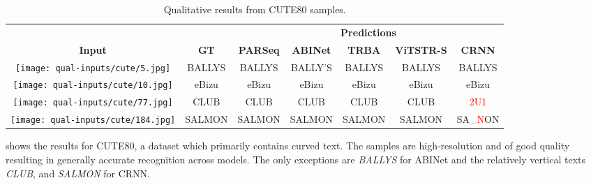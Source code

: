 \begin{table*}[htbp]
\newcommand{\customsize}{\scriptsize}
  \footnotesize
  \centering
  \setlength\tabcolsep{2pt}
  \caption{Qualitative results from CUTE80 samples.}
  \begin{tabular}{ c c c c c c c }
    \toprule
    & & \multicolumn{5}{c}{\textbf{Predictions}} \\
    \cmidrule{3-7}
    \textbf{Input} & \textbf{GT} & \textbf{PARSeq} & \textbf{ABINet} & \textbf{TRBA} & \textbf{ViTSTR-S} & \textbf{CRNN} \\
    \midrule
    \texttt{[image: qual-inputs/cute/5.jpg]} & BALLYS & BALLYS & BALLY\textcolor{red}{'}S & BALLYS & BALLYS & BALLYS \\
    \texttt{[image: qual-inputs/cute/10.jpg]} & eBizu & eBizu & eBizu & eBizu & eBizu & eBizu \\
    \texttt{[image: qual-inputs/cute/77.jpg]} & CLUB & CLUB & CLUB & CLUB & CLUB & \textcolor{red}{2U1} \\
\texttt{[image: qual-inputs/cute/184.jpg]} & SALMON & SALMON & SALMON & SALMON & SALMON & SA\textcolor{red}{\_N}ON \\
    \bottomrule
  \end{tabular}
  \label{tab:qual-results-cute}
\end{table*}


 shows the results for CUTE80, a dataset which primarily contains curved text. The samples are high-resolution and of good quality resulting in generally accurate recognition across models. The only exceptions are \textit{BALLYS} for ABINet and the relatively vertical texts \textit{CLUB}, and \textit{SALMON} for CRNN.


